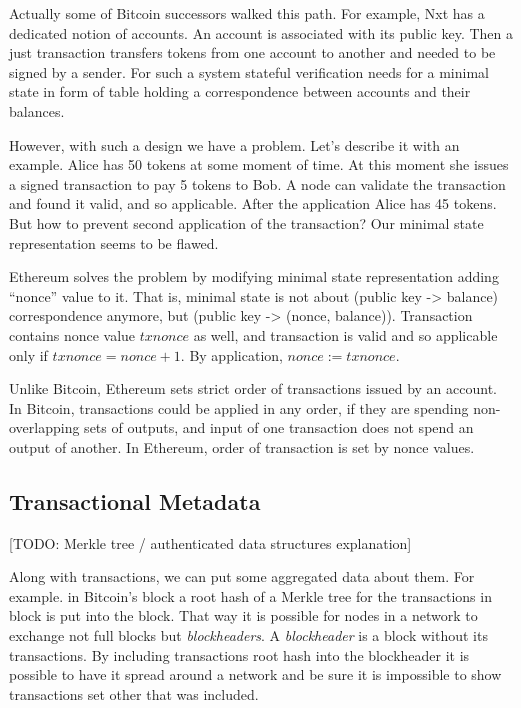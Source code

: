 \documentclass[]{report}   %
\begin{document}
Actually some of Bitcoin successors walked this path. For example, Nxt has a dedicated notion of accounts. An account is associated with its public key. Then a just transaction transfers tokens from one account to another and needed to be signed by a sender. For such a system stateful verification needs for a minimal state in form of table holding a correspondence between accounts and their balances.

However, with such a design we have a problem. Let's describe it with an example. Alice has 50 tokens at some moment of time. At this moment she issues a signed transaction to pay 5 tokens to Bob. A node can validate the transaction and found it valid, and so applicable. After the application Alice has 45 tokens. But how to prevent second application of the transaction? Our minimal state representation seems to be flawed.

Ethereum solves the problem by modifying minimal state representation adding ``nonce'' value to it. That is, minimal state is not about (public key -> balance) correspondence anymore, but (public key -> (nonce, balance)). Transaction contains nonce value \(txnonce\) as well, and transaction is valid and so applicable only if \(txnonce = nonce + 1\). By application, \(nonce := txnonce\). 

Unlike Bitcoin, Ethereum sets strict order of transactions issued by an account. In Bitcoin, transactions could be applied in any order, 
if they are spending non-overlapping sets of outputs, and input of one transaction does not spend an output of another. In Ethereum, order of transaction is set by nonce values. 

\subsection{Transactional Metadata}

[TODO: Merkle tree / authenticated data structures explanation]

Along with transactions, we can put some aggregated data about them. For example. in Bitcoin's block a root hash of a Merkle tree for the transactions in block is put into the block. That way it is possible for nodes in a network to exchange not full blocks but \textit{blockheaders}. A \textit{blockheader} is a block without its transactions. By including transactions root hash into the blockheader it is possible to have it spread around a network and be sure it is impossible to show transactions set other that was included. 
\end{document}
